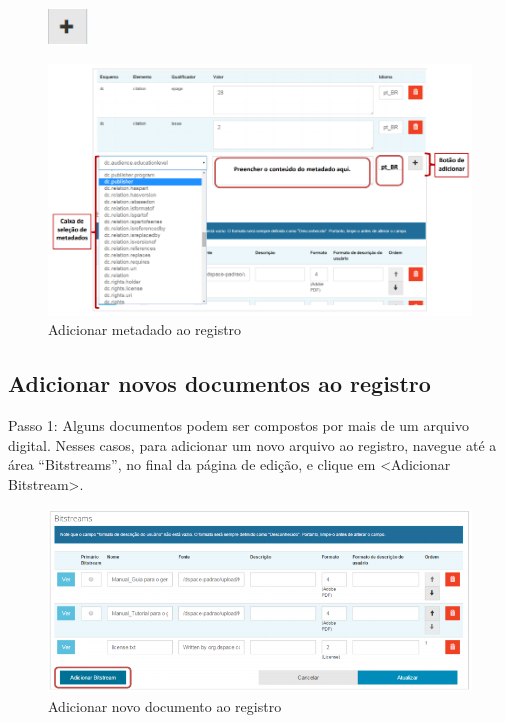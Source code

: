 \documentclass[12pt,hidelinks]{article}
\begin{document}
    \begin{figure}[!htp]
                \centering
                \includegraphics[scale=0.7]{figura/mais.png}
            \label{Rotulo}
        \end{figure}

\newpage

    \begin{figure}[!htp]
                \centering
                \includegraphics[scale=0.7]{figura/Figura94.png}
                \caption{Adicionar metadado ao registro}
            \label{Rotulo}
        \end{figure}
    
    \subsection{Adicionar novos documentos ao registro}
    
    Passo 1: Alguns documentos podem ser compostos por mais de um arquivo digital. Nesses casos, para adicionar um novo arquivo ao registro, navegue até a área “Bitstreams”, no final da página de edição, e clique em <Adicionar Bitstream>.
    
    \begin{figure}[!htp]
                \centering
                \includegraphics[scale=0.7]{figura/Figura95.png}
                \caption{Adicionar novo documento ao registro}
            \label{Rotulo}
        \end{figure}
\end{document}
